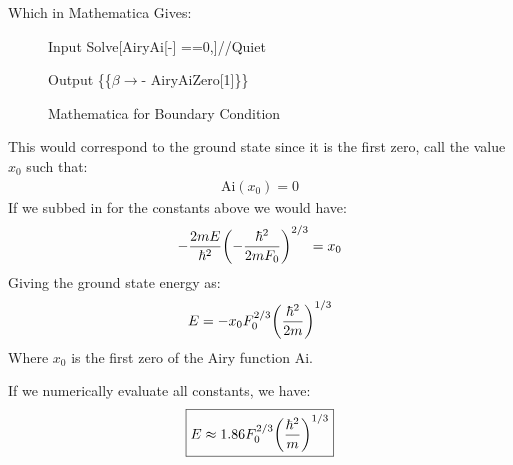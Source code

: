 \documentclass[12pt]{article}
\begin{document}
Which in Mathematica Gives:
\begin{figure}[H]
  \centering
  \begin{mmaCell}[addtoindex=2]{Input}
    Solve[AiryAi[-] ==0,\mmaFnc{\(\pmb{\beta}\)}]//Quiet
\end{mmaCell}

\begin{mmaCell}{Output}
  \{\{\(\beta\to\)- AiryAiZero[1]\}\}
\end{mmaCell}
  \caption{Mathematica for Boundary Condition}
\end{figure}
This would correspond to the ground state since it is the first zero, call the value $x_0$ such that:
\begin{align*}
  \mathrm{Ai}(x_0)=0
\end{align*}
If we subbed in for the constants above we would have:
\begin{align*}
  -\frac{2mE}{\hbar^2}\qty(-\frac{\hbar^2}{2mF_0})^{2/3}=x_0
\end{align*}
Giving the ground state energy as:
\begin{align*}
  E=-x_0F_0^{2/3}\qty(\frac{\hbar^2}{2m})^{1/3}
\end{align*}
Where $x_0$ is the first zero of the Airy function $\mathrm{Ai}$.

If we numerically evaluate all constants, we have:
\begin{align}
  \boxed{E\approx1.86F_0^{2/3}\qty(\frac{\hbar^2}{m})^{1/3}}
\end{align}
\end{document}
